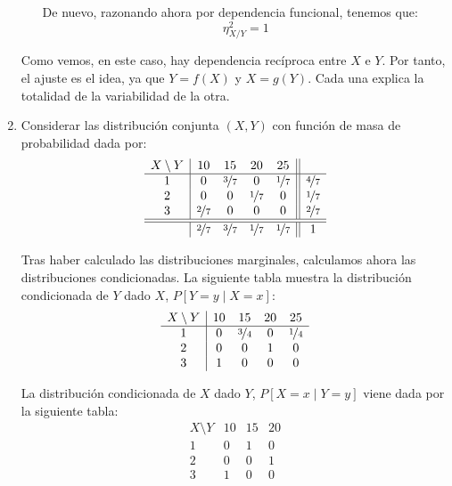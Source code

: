 \begin{ejercicio}
\begin{enumerate}
\begin{itemize}
            De nuevo, razonando ahora por dependencia funcional, tenemos que:
            \begin{equation*}
                \eta^2_{X/Y} = 1
            \end{equation*}
        \end{itemize}

        Como vemos, en este caso, hay dependencia recíproca entre $X$ e $Y$. Por tanto,
        el ajuste es el idea, ya que $Y=f(X)$ y $X=g(Y)$.
        Cada una explica la totalidad de la variabilidad de la otra.


        \item Considerar las distribución conjunta $(X,Y)$ con función de masa de probabilidad dada por:
        \begin{equation*}
            \begin{array}{c|cccc||c}
                X\setminus Y & 10 & 15 & 20 & 25 &\\
                \hline
                1 & 0 & \nicefrac{3}{7} & 0 & \nicefrac{1}{7} & \nicefrac{4}{7}\\
                2 & 0 & 0 & \nicefrac{1}{7} & 0 & \nicefrac{1}{7}\\
                3 & \nicefrac{2}{7} & 0 & 0 & 0 & \nicefrac{2}{7}\\
                \hline \hline
                & \nicefrac{2}{7} & \nicefrac{3}{7} & \nicefrac{1}{7} & \nicefrac{1}{7} & 1
            \end{array}
        \end{equation*}

        Tras haber calculado las distribuciones marginales, calculamos ahora las distribuciones condicionadas.
        La siguiente tabla muestra la distribución condicionada de $Y$ dado $X$, $P[Y = y\mid X = x]$:
        \begin{equation*}
            \begin{array}{c|cccc}
                X\setminus Y & 10 & 15 & 20 & 25\\
                \hline
                1 & 0 & \nicefrac{3}{4} & 0 & \nicefrac{1}{4}\\
                2 & 0 & 0 & 1 & 0\\
                3 & 1 & 0 & 0 & 0
            \end{array}
        \end{equation*}

        La distribución condicionada de $X$ dado $Y$, $P[X = x\mid Y = y]$ viene dada por la siguiente tabla:
        \begin{equation*}
            \begin{array}{c|ccc}
                X\setminus Y & 10 & 15 & 20\\
                \hline
                1 & 0 & 1 & 0\\
                2 & 0 & 0 & 1\\
                3 & 1 & 0 & 0
            \end{array}
        \end{equation*}


\end{enumerate}
\end{ejercicio}
